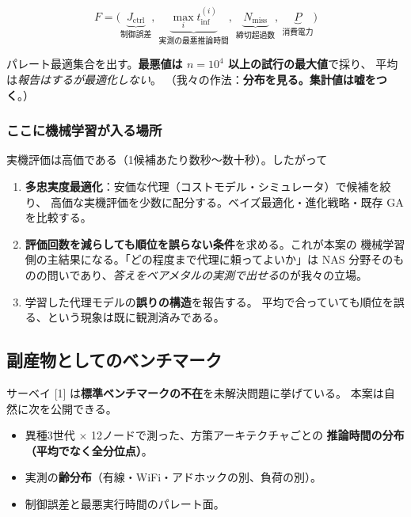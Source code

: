 \documentclass[11pt,a4paper]{article}
\newcommand{\prob}[1]{\textbf{\textcolor{red!55!black}{#1}}}
\newcommand{\keyp}[1]{\textbf{\textcolor{blue!45!black}{#1}}}
\begin{document}
\[
  F = \bigl(\underbrace{J_{\mathrm{ctrl}}}_{\text{制御誤差}},\
      \underbrace{\max_i t_{\mathrm{inf}}^{(i)}}_{\text{実測の最悪推論時間}},\
      \underbrace{N_{\mathrm{miss}}}_{\text{締切超過数}},\
      \underbrace{P}_{\text{消費電力}}\bigr)
\]

\noindent
パレート最適集合を出す。\keyp{最悪値は $n=10^4$ 以上の試行の最大値}で採り、
平均は\emph{報告はするが最適化しない}。
（我々の作法：\keyp{分布を見る。集計値は嘘をつく}。）

\subsubsection*{ここに機械学習が入る場所}

実機評価は高価である（1候補あたり数秒〜数十秒）。したがって

\begin{enumerate}[leftmargin=1.6em,itemsep=3pt]
  \item \keyp{多忠実度最適化}：安価な代理（コストモデル・シミュレータ）で候補を絞り、
        高価な実機評価を少数に配分する。ベイズ最適化・進化戦略・既存 GA を比較する。
  \item \keyp{評価回数を減らしても順位を誤らない条件}を求める。これが本案の
        機械学習側の主結果になる。「どの程度まで代理に頼ってよいか」は
        NAS 分野そのものの問いであり、\emph{答えをベアメタルの実測で出せる}のが我々の立場。
  \item 学習した代理モデルの\prob{誤りの構造}を報告する。
        平均で合っていても順位を誤る、という現象は既に観測済みである。
\end{enumerate}

\subsection{副産物としてのベンチマーク}

サーベイ [1] は\keyp{標準ベンチマークの不在}を未解決問題に挙げている。
本案は自然に次を公開できる。

\begin{itemize}[leftmargin=1.4em,itemsep=2pt]
  \item 異種3世代 $\times$ 12ノードで測った、方策アーキテクチャごとの
        \keyp{推論時間の分布（平均でなく全分位点）}。
  \item 実測の\keyp{齢分布}（有線・WiFi・アドホックの別、負荷の別）。
  \item 制御誤差と最悪実行時間のパレート面。
\end{itemize}
\end{document}
